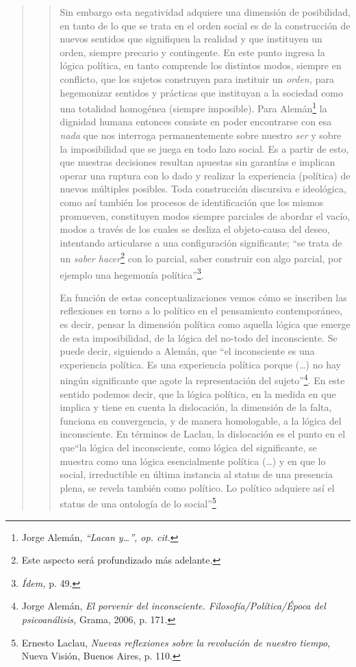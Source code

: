 \begin{quote}
\begin{quote}
Sin embargo esta negatividad adquiere una dimensión de posibilidad, en tanto de lo que se trata en el orden social es de la construcción de nuevos sentidos que signifiquen la realidad y que instituyen un orden, siempre precario y contingente. En este punto ingresa la lógica política, en tanto comprende los distintos modos, siempre en conflicto, que los sujetos construyen para instituir un \emph{orden,} para hegemonizar sentidos y prácticas que instituyan a la sociedad como una totalidad homogénea (siempre imposible). Para Alemán\footnote{Jorge Alemán, \emph{\enquote{Lacan y\ldots}, op. cit.}} la dignidad humana entonces consiste en poder encontrarse con esa \emph{nada} que nos interroga permanentemente sobre nuestro \emph{ser} y sobre la imposibilidad que se juega en todo lazo social. Es a partir de esto, que nuestras decisiones resultan apuestas sin garantías e implican operar una ruptura con lo dado y realizar la experiencia (política) de nuevos múltiples posibles. Toda construcción discursiva e ideológica, como así también los procesos de identificación que los mismos promueven, constituyen modos siempre parciales de abordar el vacío, modos a través de los cuales se desliza el objeto-causa del deseo, intentando articularse a una configuración significante; \enquote{se trata de un \emph{saber hacer}\footnote{Este aspecto será profundizado más adelante.} con lo parcial, saber construir con algo parcial, por ejemplo una hegemonía política}\footnote{\emph{Ídem,} p. 49.}.

En función de estas conceptualizaciones vemos cómo se inscriben las reflexiones en torno a lo político en el pensamiento contemporáneo, es decir, pensar la dimensión política como aquella lógica que emerge de esta imposibilidad, de la lógica del no-todo del inconsciente. Se puede decir, siguiendo a Alemán, que \enquote{el inconsciente es una experiencia política. Es una experiencia política porque (\dots) no hay ningún significante que agote la representación del sujeto}\footnote{Jorge Alemán, \emph{El porvenir del inconsciente. Filosofía/Política/Época del psicoanálisis,} Grama, 2006, p. 171.}. En este sentido podemos decir, que la lógica política, en la medida en que implica y tiene en cuenta la dislocación, la dimensión de la falta, funciona en convergencia, y de manera homologable, a la lógica del inconsciente. En términos de Laclau, la dislocación es el punto en el que\enquote{la lógica del inconsciente, como lógica del significante, se muestra como una lógica esencialmente política (\dots) y en que lo social, irreductible en última instancia al status de una presencia plena, se revela también como político. Lo político adquiere así el status de una ontología de lo social}\footnote{Ernesto Laclau, \emph{Nuevas reflexiones sobre la revolución de nuestro tiempo,} Nueva Visión, Buenos Aires, p. 110.}
\end{quote}


\end{quote}
